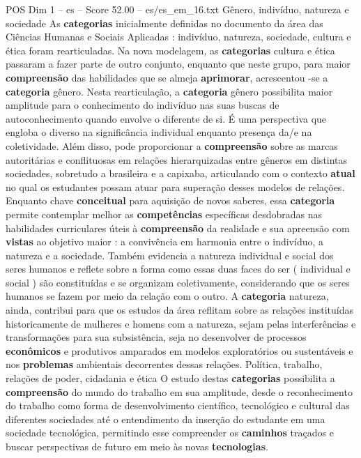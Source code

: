 \begin{textsample}{POS Dim 1 – es – Score 52.00 – es/es\_em\_16.txt}
Gênero, indivíduo, natureza e sociedade As \textbf{categorias} inicialmente definidas no documento da área das Ciências Humanas e Sociais Aplicadas : indivíduo, natureza, sociedade, cultura e ética foram rearticuladas.
Na nova modelagem, as \textbf{categorias} cultura e ética passaram a fazer parte de outro conjunto, enquanto que neste grupo, para maior \textbf{compreensão} das habilidades que se almeja \textbf{aprimorar}, acrescentou -se a \textbf{categoria} gênero.
Nesta rearticulação, a \textbf{categoria} gênero possibilita maior amplitude para o conhecimento do indivíduo nas suas buscas de autoconhecimento quando envolve o diferente de si.
É uma perspectiva que engloba o diverso na significância individual enquanto presença da/e na coletividade.
Além disso, pode proporcionar a \textbf{compreensão} sobre as marcas autoritárias e conflituosas em relações hierarquizadas entre gêneros em distintas sociedades, sobretudo a brasileira e a capixaba, articulando com o contexto \textbf{atual} no qual os estudantes possam atuar para superação desses modelos de relações.
Enquanto chave \textbf{conceitual} para aquisição de novos saberes, essa \textbf{categoria} permite contemplar melhor as \textbf{competências} específicas desdobradas nas habilidades curriculares úteis à \textbf{compreensão} da realidade e sua apreensão com \textbf{vistas} ao objetivo maior : a convivência em harmonia entre o indivíduo, a natureza e a sociedade.
Também evidencia a natureza individual e social dos seres humanos e reflete sobre a forma como essas duas faces do ser ( individual e social ) são constituídas e se organizam coletivamente, considerando que os seres humanos se fazem por meio da relação com o outro.
A \textbf{categoria} natureza, ainda, contribui para que os estudos da área reflitam sobre as relações instituídas historicamente de mulheres e homens com a natureza, sejam pelas interferências e transformações para sua subsistência, seja no desenvolver de processos \textbf{econômicos} e produtivos amparados em modelos exploratórios ou sustentáveis e nos \textbf{problemas} ambientais decorrentes dessas relações.
Política, trabalho, relações de poder, cidadania e ética O estudo destas \textbf{categorias} possibilita a \textbf{compreensão} do mundo do trabalho em sua amplitude, desde o reconhecimento do trabalho como forma de desenvolvimento científico, tecnológico e cultural das diferentes sociedades até o entendimento da inserção do estudante em uma sociedade tecnológica, permitindo esse compreender os \textbf{caminhos} traçados e buscar perspectivas de futuro em meio às novas \textbf{tecnologias}.

\end{textsample}
